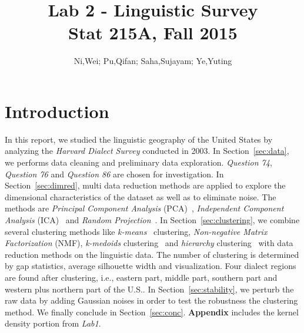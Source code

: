 \documentclass[english]{article}\usepackage{graphicx, color}
\numberwithin{equation}{section}
\numberwithin{figure}{section}
\begin{document}
\title{Lab 2 - Linguistic Survey\\
Stat 215A, Fall 2015}


\author{Ni,Wei; Pu,Qifan; Saha,Sujayam; Ye,Yuting}

\maketitle



\section{Introduction}
\label{sec:intro}
\qquad In this report, we studied the linguistic geography of the United States by analyzing the \textit{Harvard Dialect Survey} conducted in 2003. In Section~\ref{sec:data}, we performs data cleaning and preliminary data exploration. \textit{Question 74}, \textit{Question 76} and \textit{Question 86} are chosen for investigation. In Section~\ref{sec:dimred}, multi data reduction methods are applied to explore the dimensional characteristics of the dataset as well as to eliminate noise. The methods are \textit{Principal Component Analysis} (PCA)~\cite{pca}, \textit{Independent Component Analysis} (ICA)~\cite{ica} and \textit{Random Projection}~\cite{randomprojection}. In Section~\ref{sec:clustering}, we combine several clustering methods like \textit{k-means}~\cite{kmeans} clustering, \textit{Non-negative Matrix Factorization} (NMF)\cite{nmf}, \textit{k-medoids} clustering~\cite{kmedoids} and \textit{hierarchy} clustering~\cite{hierarchical} with data reduction methods on the linguistic data. The number of clustering is determined by gap statistics, average silhouette width and visualization. Four dialect regions are found after clustering, i.e., eastern part, middle part, southern part and western plus northern part of the U.S..  In Section~\ref{sec:stability}, we perturb the raw data by adding Gaussian noises in order to test the robustness the clustering method. We finally conclude in Section~\ref{sec:conc}. \textbf{Appendix} includes the kernel density portion from \textit{Lab1}.





\end{document}
